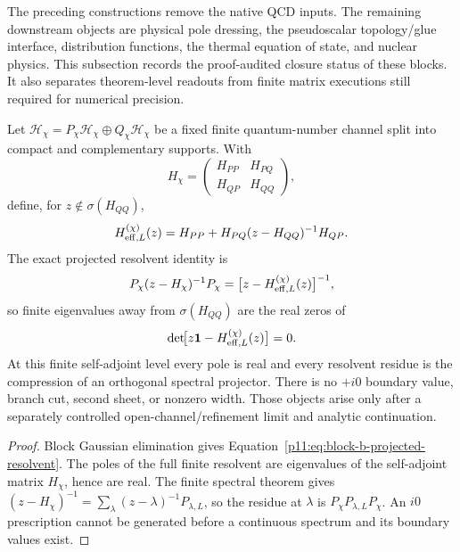 \documentclass[12pt,a4paper]{article}
\begin{document}
The preceding constructions remove the native QCD inputs.  The remaining downstream objects are physical pole dressing, the pseudoscalar topology/glue interface, distribution functions, the thermal equation of state, and nuclear physics.  This subsection records the proof-audited closure status of these blocks.  It also separates theorem-level readouts from finite matrix executions still required for numerical precision.

\begin{theorem}
\label{p11:thm:block-b-finite-pole-dressing}
Let \(\mathcal H_\chi=P_\chi\mathcal H_\chi\oplus Q_\chi\mathcal H_\chi\)
be a fixed finite quantum-number channel split into compact and complementary
supports.  With
\begin{equation}
H_\chi=\begin{pmatrix}H_{PP}&H_{PQ}\\ H_{QP}&H_{QQ}\end{pmatrix},
\end{equation}
define, for \(z\notin\sigma(H_{QQ})\),
\begin{equation}
\label{p11:eq:block-b-feshbach-effective-hamiltonian}
H_{{\rm eff},L}^{(\chi)}(z)
=H_{PP}+H_{PQ}(z-H_{QQ})^{-1}H_{QP}.
\end{equation}
The exact projected resolvent identity is
\begin{equation}
\label{p11:eq:block-b-projected-resolvent}
P_\chi(z-H_\chi)^{-1}P_\chi
=\bigl[z-H_{{\rm eff},L}^{(\chi)}(z)\bigr]^{-1},
\end{equation}
so finite eigenvalues away from \(\sigma(H_{QQ})\) are the real zeros of
\begin{equation}
\label{p11:eq:block-b-pole-equation}
\det\!\bigl[z\mathbf 1-H_{{\rm eff},L}^{(\chi)}(z)\bigr]=0.
\end{equation}
At this finite self-adjoint level every pole is real and every resolvent residue
is the compression of an orthogonal spectral projector.  There is no
\(+i0\) boundary value, branch cut, second sheet, or nonzero width.  Those
objects arise only after a separately controlled open-channel/refinement limit
and analytic continuation.
\end{theorem}
\begin{proof}
Block Gaussian elimination gives
Equation~\eqref{p11:eq:block-b-projected-resolvent}.  The poles of the full
finite resolvent are eigenvalues of the self-adjoint matrix \(H_\chi\), hence
are real.  The finite spectral theorem gives
\((z-H_\chi)^{-1}=\sum_\lambda(z-\lambda)^{-1}P_{\lambda,L}\), so the residue
at \(\lambda\) is \(P_\chi P_{\lambda,L}P_\chi\).  An \(i0\) prescription
cannot be generated before a continuous spectrum and its boundary values
exist.
\end{proof}
\end{document}
